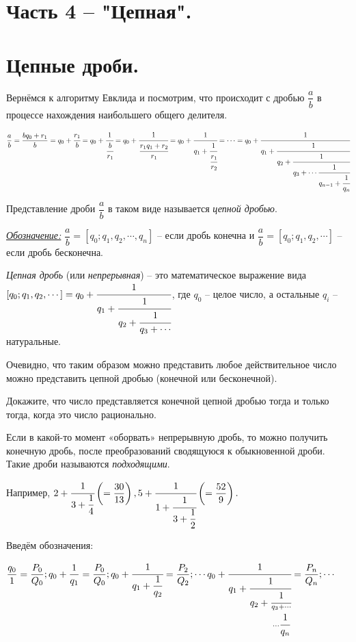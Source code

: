 \section{Часть 4 -- "Цепная".}

\section{Цепные дроби.}

Вернёмся к алгоритму Евклида и посмотрим, что происходит с дробью $\dfrac{a}{b}$ в процессе нахождения наибольшего общего делителя.


$\dfrac{a}{b} = \dfrac{bq_0 + r_1}{b} = q_0 + \cfrac{r_1}{b} = q_0 + \cfrac{1}{\cfrac{b}{r_1}} = q_0+\cfrac{1}{\cfrac{r_1q_1 + r_2}{r_1}} = q_0 + \cfrac{1}{q_1 + \cfrac{1}{\cfrac{r_1}{r_2}}} = \cdots = q_0 + \cfrac{1}{q_1 + \cfrac{1}{q_2 + \cfrac{1}{q_3 + \cdots \cfrac{1}{q_{n - 1} + \cfrac{1}{q_n}}}}}$

\noindent Представление дроби $\dfrac{a}{b}$ в таком виде называется \textit{цепной дробью}.

\underline{\textit{Обозначение:}} $\dfrac{a}{b} = [q_0; q_1, q_2, \cdots, q_n]$ -- если дробь конечна и $\dfrac{a}{b} = [q_0; q_1, q_2 , \cdots]$ -- если дробь бесконечна.

\begin{dfn} 
    \textit{Цепная дробь} (или \textit{непрерывная}) -- это математическое выражение вида $[q_0; q_1, q_2, \cdots] = q_0 + \cfrac{1}{q_1 + \cfrac{1}{q_2 + \cfrac{1}{q_3 + \cdots}}}$, где $q_0$ -- целое число, а остальные $q_i$ -- натуральные. 
\end{dfn} 

\noindent Очевидно, что таким образом можно представить любое действительное число можно представить цепной дробью (конечной или бесконечной).

\begin{thm}
    Докажите, что число представляется конечной цепной дробью тогда и только тогда, когда это число рационально.
\end{thm}

\noindent Если в какой-то момент «оборвать» непрерывную дробь, то можно получить конечную дробь, после преобразований сводящуюся к обыкновенной дроби. Такие дроби называются \textit{подходящими}.

Например, $2 + \cfrac{1}{3 + \dfrac{1}{4}} \left(= \dfrac{30}{13} \right), 5 + \cfrac{1}{1 + \cfrac{1}{3 + \dfrac{1}{2}}} \left(= \dfrac{52}{9}\right).$

Введём обозначения: 
\par $\dfrac{q_0}{1} = \dfrac{P_0}{Q_0}; q_0 + \dfrac{1}{q_1} = \dfrac{P_0}{Q_0}; q_0 + \cfrac{1}{q_1 + \dfrac{1}{q_2}} = \dfrac{P_2}{Q_2}; \cdots q_0 + \cfrac{1}{q_1 + \cfrac{1}{q_2 + \cfrac{1}{{ \substack{q_3 + \cdots\\[1pt]\cdots \cfrac{1}{q_n}}  }} } } = \dfrac{P_n}{Q_n}; \cdots$

